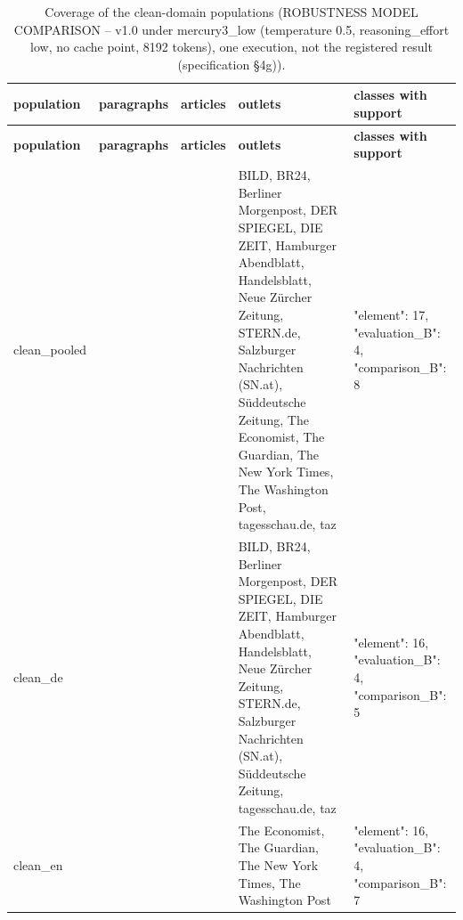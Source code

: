 \begingroup\footnotesize
\begin{longtable}{>{\raggedright\arraybackslash}p{66.8pt}>{\raggedright\arraybackslash}p{65.6pt}>{\raggedright\arraybackslash}p{52.9pt}>{\raggedright\arraybackslash}p{120.6pt}>{\raggedright\arraybackslash}p{89.2pt}}
\caption{Coverage of the clean-domain populations (ROBUSTNESS MODEL COMPARISON -- v1.0 under mercury3\_\allowbreak{}low (temperature 0.5, reasoning\_\allowbreak{}effort low, no cache point, 8192 tokens), one execution, not the registered result (specification §4g)).} \\
\toprule
\textbf{population} & \textbf{paragraphs} & \textbf{articles} & \textbf{outlets} & \textbf{classes with support} \\
\midrule
\endfirsthead
\toprule
\textbf{population} & \textbf{paragraphs} & \textbf{articles} & \textbf{outlets} & \textbf{classes with support} \\
\midrule
\endhead
\bottomrule
\endfoot
clean\_\allowbreak{}pooled & 105 & 50 & BILD, BR24, Berliner Morgenpost, DER SPIEGEL, DIE ZEIT, Hamburger Abendblatt, Handelsblatt, Neue Zürcher Zeitung, STERN.de, Salzburger Nachrichten (SN.at), Süddeutsche Zeitung, The Economist, The Guardian, The New York Times, The Washington Post, tagesschau.de, taz & {"element":\allowbreak{} 17, "evaluation\_\allowbreak{}B":\allowbreak{} 4, "comparison\_\allowbreak{}B":\allowbreak{} 8} \\
clean\_\allowbreak{}de & 49 & 24 & BILD, BR24, Berliner Morgenpost, DER SPIEGEL, DIE ZEIT, Hamburger Abendblatt, Handelsblatt, Neue Zürcher Zeitung, STERN.de, Salzburger Nachrichten (SN.at), Süddeutsche Zeitung, tagesschau.de, taz & {"element":\allowbreak{} 16, "evaluation\_\allowbreak{}B":\allowbreak{} 4, "comparison\_\allowbreak{}B":\allowbreak{} 5} \\
clean\_\allowbreak{}en & 56 & 26 & The Economist, The Guardian, The New York Times, The Washington Post & {"element":\allowbreak{} 16, "evaluation\_\allowbreak{}B":\allowbreak{} 4, "comparison\_\allowbreak{}B":\allowbreak{} 7} \\
\end{longtable}
\endgroup
